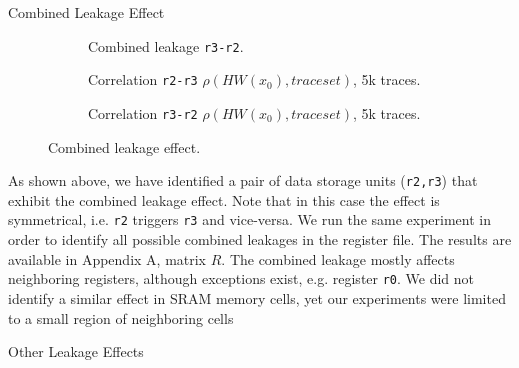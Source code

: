 \begin{subsection}{Combined Leakage Effect}
\begin{figure}[H]
\begin{subfigure}[b]{0.4\textwidth}
        \caption{\scriptsize{Combined leakage \texttt{r3-r2}.}}

    \end{subfigure}


 \begin{subfigure}[b]{0.47\textwidth}

        \caption{\scriptsize{Correlation \texttt{r2-r3} $\rho(HW(x_0),traceset)$, 5k traces.}}

    \end{subfigure}
 \begin{subfigure}[b]{0.47\textwidth}

        \caption{\scriptsize{Correlation \texttt{r3-r2} $\rho(HW(x_0),traceset)$, 5k traces.}}

    \end{subfigure}

   
    \caption{Combined leakage effect.}\label{fig:regleak}
\end{figure}


\end{subsection}
As shown above, we have identified a pair of data storage units (\texttt{r2,r3}) that exhibit the combined leakage effect. Note that in this case the effect is symmetrical, i.e. \texttt{r2} triggers \texttt{r3} and vice-versa. We run the same experiment in order to identify all possible combined leakages in the register file. The results are available in Appendix A, matrix $R$. The combined leakage mostly affects neighboring registers, although exceptions exist, e.g. register \texttt{r0}. We did not identify a similar effect in SRAM memory cells, yet our experiments were limited to a small region of neighboring cells 

\begin{subsection}{Other Leakage Effects}

\end{subsection}


